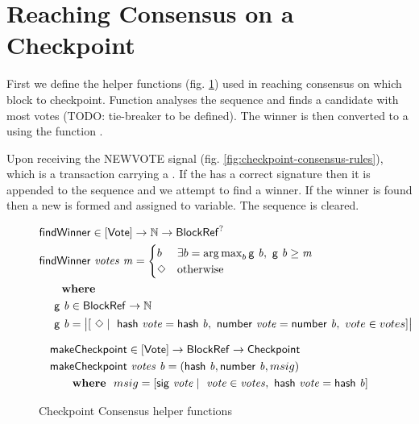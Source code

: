 \clearpage
\section{Reaching Consensus on a Checkpoint}

First we define the helper functions (fig. \ref{fig:checkpoint-consensus-helpers}) used in reaching consensus on which block to checkpoint. Function  analyses the  sequence and finds a candidate with most votes (TODO: tie-breaker to be defined). The winner is then converted to a \Chkp using the function .

Upon receiving the NEWVOTE signal (fig. \ref{fig:checkpoint-consensus-rules}), which is a transaction carrying a . If the  has a correct signature then it is appended to the  sequence and we attempt to find a winner. If the winner is found then a new \Chkp is formed and assigned to  variable. The  sequence is cleared. 

\begin{figure}[tbh]
  \begin{align*}
    & \fun{findWinner} \in \Votes \to \N \to \BlockRef^?\\
    & \fun{findWinner}~\var{votes}~\var{m} =
      \begin{cases}
        b & \exists b = \argmax_b \fun{g}~\var{b},~ \fun{g}~\var{b} \geq \var{m}  \\
        \Nothing & \text{otherwise}
      \end{cases} \\
    & ~~~~\where \\
    & ~~~~\fun{g}~\var{b} \in \BlockRef \to \N \\
    & ~~~~\fun{g}~\var{b} = \big\lvert [~\Nothing \mid\ \fun{hash}~\var{vote} = \fun{hash}~\var{b},~ \fun{number}~\var{vote} = \fun{number}~\var{b},~ vote \in votes] \big\rvert
  \end{align*}

  \begin{align*}
    & \mathsf{makeCheckpoint} \in \mathsf{[Vote]} \to \mathsf{BlockRef} \to \mathsf{Checkpoint} \\
    & \mathsf{makeCheckpoint}~\mathit{votes}~\mathit{b} = (\mathsf{hash}~\mathit{b}, \mathsf{number}~\mathit{b}, msig) \\
    & ~~~~~ ~ \mathbf{where}~ ~  msig = [\mathsf{sig}~\mathit{vote} \mid\ \mathit{vote} \in \mathit{votes},~ \mathsf{hash}~\mathit{vote} = \mathsf{hash}~\mathit{b}]
  \end{align*}

  \caption{Checkpoint Consensus helper functions}
  \label{fig:checkpoint-consensus-helpers}
\end{figure}

